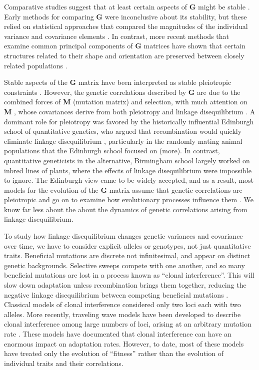 \documentclass[9pt,twocolumn,twoside]{gsajnl}
\newcommand{\G}{\textbf{G }}
\newcommand{\M}{\textbf{M }}
\begin{document}
Comparative studies suggest that at least certain aspects of \G might be stable \citep{Arnold2008}. Early methods for comparing \G were inconclusive about its stability, but these relied on statistical approaches that compared the magnitudes of the individual variance and covariance elements \citep{atchley1992evolutionary,lofsvold1986quantitative,Brodie1993,paulsen1996quantitative,roff1999does,Roff1999}. In contrast, more recent methods that examine common principal components of \G matrices have shown that certain structures related to their shape and orientation are preserved between closely related populations \citep{Arnold2008}. 

Stable aspects of the \G matrix have been interpreted as stable pleiotropic constraints \citep{lande1979quantitative,Arnold2008}. However, the genetic correlations described by \G are due to the combined forces of \M (mutation matrix) and selection, with much attention on \M, whose covariances derive from both pleiotropy and linkage disequilibrium \citep{Saltz2017}. A dominant role for pleiotropy was favored by the historically influential Edinburgh school of quantitative genetics, who argued that recombination would quickly eliminate linkage disequilibrium \citep[Chapter~20]{fox2006evolutionary}, particularly in the randomly mating animal populations that the Edinburgh school focused on \citep{lande1979quantitative,lande1980genetic,Arnold2008} (more).  In contrast, quantitative geneticists in the alternative, Birmingham school largely worked on inbred lines of plants, where the effects of linkage disequilibrium were impossible to ignore. The Edinburgh view came to be widely accepted, and as a result, most models for the evolution of the \G  matrix assume that genetic correlations are pleiotropic and go on to examine how evolutionary processes influence them \citep{Turelli1988}. We know far less about the about the dynamics of genetic correlations arising from linkage disequilibrium.

To study how linkage disequilibrium changes genetic variances and covariance over time, we have to consider explicit alleles or genotypes, not just quantitative traits. Beneficial mutations are discrete not infinitesimal, and appear on distinct genetic backgrounds. Selective sweeps compete with one another, and so many beneficial mutations are lost in a process known as ``clonal interference''. This will slow down adaptation \citep{hill1966effect} unless recombination brings them together, reducing the negative linkage disequilibrium between competing beneficial mutations \citep{fisher1930genetical,muller1932some}. Classical models of clonal interference considered only two loci each with two alleles. More recently, traveling wave models have been developed to describe clonal interference among large numbers of loci, arising at an arbitrary mutation rate \citep{rouzine2003solitary,desai2007beneficial,park2010speed,good2012distribution,neher2010rate,fisher2013asexual,rouzine2010multi,rouzine2007highly,rouzine2008traveling}. These models have documented that clonal interference can have an enormous impact on adaptation rates. However, to date, most of these models have treated only the evolution of ``fitness'' rather than the evolution of individual traits and their correlations. 
\end{document}
